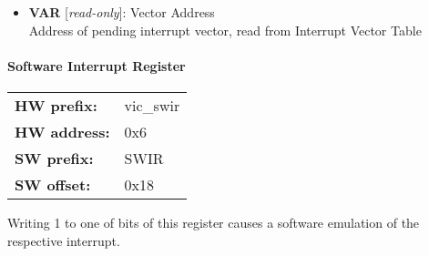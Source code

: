 \vspace{12pt}
\noindent
{}

\begin{itemize}
\item \begin{small}
{\bf 
VAR
} [\emph{read-only}]: Vector Address
\\
Address of pending interrupt vector, read from Interrupt Vector Table
\end{small}
\end{itemize}
\paragraph*{Software Interrupt Register}\vspace{12pt}

\begin{tabular}{l l }
{\bf HW prefix:}  & vic\_swir\\
{\bf HW address:}  & 0x6\\
{\bf SW prefix:}  & SWIR\\
{\bf SW offset:}  & 0x18\\
\end{tabular}

\vspace{12pt}
Writing 1 to one of bits of this register causes a software emulation of the respective interrupt.

